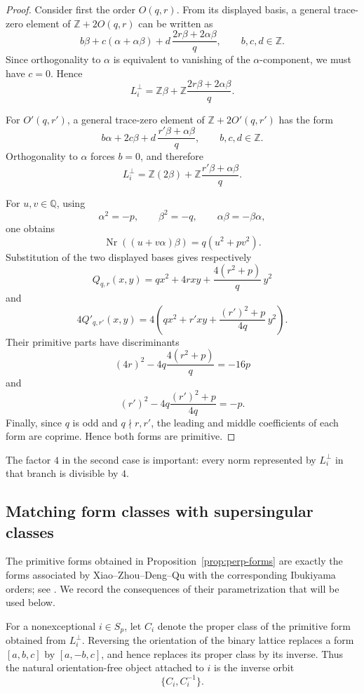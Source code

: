 \documentclass[10pt,a4paper]{amsart}
\newcommand{\Q}{\mathbb{Q}}
\newcommand{\Z}{\mathbb{Z}}
\newcommand{\Nr}{\operatorname{Nr}}
\begin{document}
\begin{proof}
Consider first the order $O(q,r)$.  From its displayed basis, a general
trace-zero element of $\Z+2O(q,r)$ can be written as
\[
  b\beta+c(\alpha+\alpha\beta)
  +d\,\frac{2r\beta+2\alpha\beta}{q},
  \qquad b,c,d\in\Z.
\]
Since orthogonality to $\alpha$ is equivalent to vanishing of the
$\alpha$-component, we must have $c=0$.  Hence
\[
  L_i^\perp
  =\Z\beta+
   \Z\frac{2r\beta+2\alpha\beta}{q}.
\]

For $O'(q,r')$, a general trace-zero element of $\Z+2O'(q,r')$ has the form
\[
  b\alpha+2c\beta
  +d\,\frac{r'\beta+\alpha\beta}{q},
  \qquad b,c,d\in\Z.
\]
Orthogonality to $\alpha$ forces $b=0$, and therefore
\[
  L_i^\perp
  =\Z(2\beta)+
   \Z\frac{r'\beta+\alpha\beta}{q}.
\]

For $u,v\in\Q$, using
\[
  \alpha^2=-p,\qquad
  \beta^2=-q,\qquad
  \alpha\beta=-\beta\alpha,
\]
one obtains
\[
  \Nr((u+v\alpha)\beta)=q(u^2+pv^2).
\]
Substitution of the two displayed bases gives respectively
\[
  Q_{q,r}(x,y)
  =qx^2+4rxy+\frac{4(r^2+p)}q\,y^2
\]
and
\[
  4Q'_{q,r'}(x,y)
  =4\left(
      qx^2+r'xy+\frac{(r')^2+p}{4q}\,y^2
    \right).
\]
Their primitive parts have discriminants
\[
  (4r)^2-4q\frac{4(r^2+p)}q=-16p
\]
and
\[
  (r')^2-4q\frac{(r')^2+p}{4q}=-p.
\]
Finally, since $q$ is odd and $q\nmid r,r'$, the leading and middle
coefficients of each form are coprime. Hence both forms are primitive.
\end{proof}

The factor $4$ in the second case is important: every norm represented by $L_i^\perp$ in that branch is divisible by $4$.



\subsection{Matching form classes with supersingular classes}

The primitive forms obtained in Proposition~\ref{prop:perp-forms} are
exactly the forms associated by Xiao--Zhou--Deng--Qu with the corresponding
Ibukiyama orders; see
\cite[Section~3, especially Theorems~3.3 and~3.5]{XZDQ2025}.
We record the consequences of their parametrization that will be used
below.

For a nonexceptional $i\in S_p$, let $C_i$ denote the proper class of the
primitive form obtained from $L_i^\perp$. Reversing the orientation of the
binary lattice replaces a form $[a,b,c]$ by $[a,-b,c]$, and hence replaces
its proper class by its inverse. Thus the natural orientation-free object
attached to $i$ is the inverse orbit
\[
  \{C_i,C_i^{-1}\}.
\]
\end{document}
